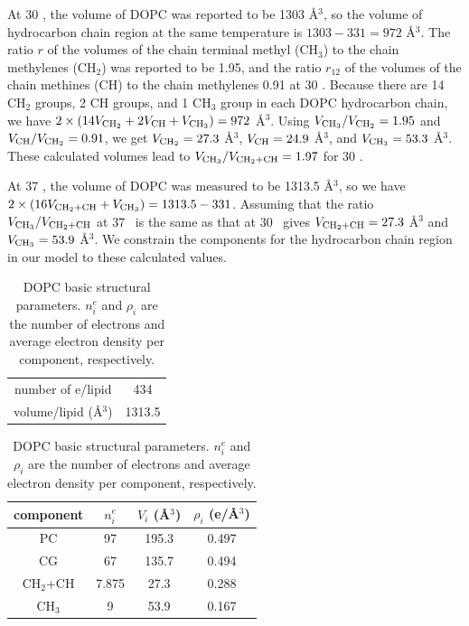 At 30 \textcelsius, the volume of DOPC was reported to be 1303 \AA$^3$, 
so the volume of hydrocarbon chain region at the same temperature is 
$1303 - 331 = 972$ \AA$^3$. The ratio $r$ of the volumes
of the chain terminal methyl (CH$_3$) to the chain methylenes (CH$_2$) was 
reported to be 1.95, and the ratio $r_{12}$ of the volumes of the chain
methines (CH) to the chain methylenes 0.91 at 30 \textcelsius. 
Because there are 14 CH$_2$ groups,
2 CH groups, and 1 CH$_3$ group in each DOPC hydrocarbon chain, we have
$2\times(14V_{\textrm{CH}_2}+2V_\textrm{CH}+V_{\textrm{CH}_3})=972$ \AA$^3$. 
Using $V_{\textrm{CH}_3}/V_{\textrm{CH}_2}=1.95$ 
and $V_\textrm{CH}/V_{\textrm{CH}_2}=0.91$, we get $V_{\textrm{CH}_2}=27.3$ \AA$^3$, 
$V_\textrm{CH}=24.9$ \AA$^3$, and $V_{\textrm{CH}_3}=53.3$ \AA$^3$. 
These calculated volumes lead to $V_{\textrm{CH}_3}/V_{\textrm{CH}_2+\textrm{CH}}=1.97$  for 30 \textcelsius. 

At 37 \textcelsius, the volume of DOPC was measured to be 1313.5 \AA$^3$, so
we have $2\times(16V_{\textrm{CH}_2+\textrm{CH}}+V_{\textrm{CH}_3})=1313.5-331$. Assuming that the ratio 
$V_{\textrm{CH}_3}/V_{\textrm{CH}_2+\textrm{CH}}$ at 37 \textcelsius\ is the same as that at 30 \textcelsius\ 
gives $V_{\textrm{CH}_2+\textrm{CH}}=27.3$ \AA$^3$ and $V_{\textrm{CH}_3}=53.9$ \AA$^3$. We constrain
the components for the hydrocarbon chain region in our model 
to these calculated values.
\begin{table}[htbp]
  \centering
  \begin{tabular}{ cc }
  \hline
    number of e/lipid & 434 \\ 
    volume/lipid (\AA$^3$) & 1313.5 \\
  \hline
  \end{tabular}
  \quad
  \begin{tabular}{ cccc }
    \hline
    component & $n^e_i$ & $V_i$ (\AA$^3$) & $\rho_i$ (e/\AA$^3$) \\
    \hline 
    PC & 97 & 195.3 & 0.497 \\  
    CG & 67 & 135.7 & 0.494 \\  
    CH$_2$+CH & 7.875 & 27.3 & 0.288 \\
    CH$_3$ & 9 & 53.9 & 0.167 \\
    \hline
  \end{tabular}
  \caption{DOPC basic structural parameters. $n^e_i$ and $\rho_i$ are
  the number of electrons and average electron density per component, 
  respectively.}
  \label{tb:DOPC_basic_params}
\end{table}
